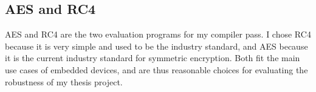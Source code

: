 \subsection{AES and RC4}
AES\cite{daemen2013design} and RC4\cite{rc4} are the two evaluation programs for my compiler pass.
I chose RC4 because it is very simple and used to be the industry standard, and AES because it is the current industry standard for symmetric encryption.
Both fit the main use cases of embedded devices, and are thus reasonable choices for evaluating the robustness of my thesis project.
